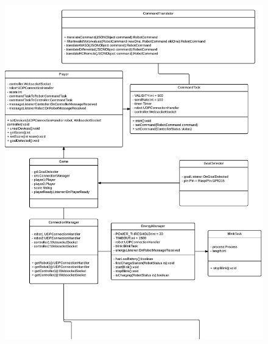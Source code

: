 \begin{figure}
	\includegraphics[page=1,width=\textwidth]{images/uml_software_all.pdf}

\end{figure}
